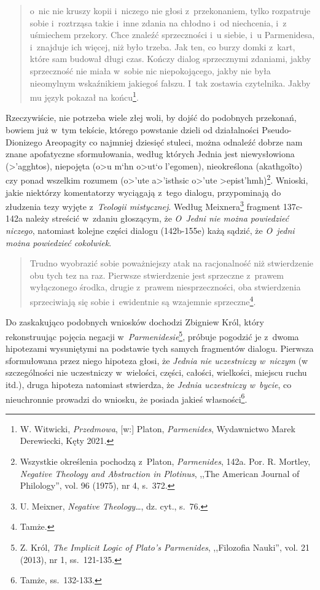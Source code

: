 \begin{quote}
o~nic nie kruszy kopii i~niczego nie głosi z~przekonaniem, tylko rozpatruje sobie i~roztrząsa takie i~inne zdania na chłodno i~od niechcenia, i~z uśmiechem przekory. Chce znaleźć sprzeczności i~u siebie, i~u Parmenidesa, i~znajduje ich więcej, niż było trzeba. Jak ten, co burzy domki z~kart, które sam budował długi czas. Kończy dialog sprzecznymi zdaniami, jakby sprzeczność nie miała w~sobie nic niepokojącego, jakby nie była nieomylnym wskaźnikiem jakiegoś fałszu. I~tak zostawia czytelnika. Jakby mu język pokazał na końcu\footnote{W. Witwicki, \textit{Przedmowa}, [w:] Platon, \textit{Parmenides}, Wydawnictwo Marek Derewiecki, Kęty 2021.}.
\end{quote}

Rzeczywiście, nie potrzeba wiele złej woli, by dojść do podobnych przekonań, bowiem już w~tym tekście, którego powstanie dzieli od działalności Pseudo-Dionizego Areopagity co najmniej dziesięć stuleci, można odnaleźć dobrze nam znane apofatyczne sformułowania, według których Jednia jest niewysłowiona (\textgreek{>'agghtos}), niepojęta (\textgreek{o>u m`hn o>ut`o l'egomen}), nieokreślona (\textgreek{akathgo\~ito}) czy ponad wszelkim rozumem (\textgreek{o>'ute a>'isthsic o>'ute >epist'hmh})\footnote{Wszystkie określenia pochodzą z~Platon, \textit{Parmenides}, 142a. Por. R. Mortley, \textit{Negative Theology and Abstraction in Plotinus}, ,,The American Journal of Philology'', vol. 96 (1975), nr 4, s.~372.}. Wnioski, jakie niektórzy komentatorzy wyciągają z~tego dialogu, przypominają do złudzenia tezy wyjęte z~\textit{Teologii mistycznej}. Według Meixnera\footnote{U. Meixner, \textit{Negative Theology}\ldots, dz. cyt., s.~76.} fragment 137c-142a należy streścić w~zdaniu głoszącym, że \textit{O~Jedni nie można powiedzieć niczego}, natomiast kolejne części dialogu (142b-155e) każą sądzić, że \textit{O~jedni można powiedzieć cokolwiek}.

\begin{quote}
Trudno wyobrazić sobie poważniejszy atak na racjonalność niż stwierdzenie obu tych tez na raz. Pierwsze stwierdzenie jest sprzeczne z~prawem wyłączonego środka, drugie z~prawem niesprzeczności, oba stwierdzenia sprzeciwiają się sobie i~ewidentnie są wzajemnie sprzeczne\footnote{Tamże.}.
\end{quote}

Do zaskakująco podobnych wniosków dochodzi Zbigniew Król, który rekonstruując pojęcia negacji w~\textit{Parmenidesie}\footnote{Z. Król, \textit{The Implicit Logic of Plato's Parmenides}, ,,Filozofia Nauki'', vol. 21 (2013), nr 1, ss.~121-135.}, próbuje pogodzić je z~dwoma hipotezami wysuniętymi na podstawie tych samych fragmentów dialogu. Pierwsza sformułowana przez niego hipoteza głosi, że \textit{Jednia nie uczestniczy w~niczym} (w szczególności nie uczestniczy w~wielości, części, całości, wielkości, miejscu ruchu itd.), druga hipoteza natomiast stwierdza, że \textit{Jednia uczestniczy w~bycie}, co nieuchronnie prowadzi do wniosku, że posiada jakieś własności\footnote{Tamże, ss.~132-133.}.

